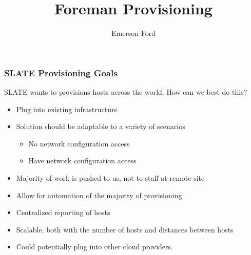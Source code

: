\documentclass{beamer}
\title{Foreman Provisioning}
\author{Emerson Ford}
\date{}
\begin{document}
\frame{\titlepage}

\begin{frame}
	\frametitle{SLATE Provisioning Goals}
	SLATE wants to provisions hosts across the world. How can we best do this?
	\begin{itemize}
		\item Plug into existing infrastructure
		\item Solution should be adaptable to a variety of scenarios
		      \begin{itemize}
			      \item No network configuration access
			      \item Have network configuration access
		      \end{itemize}
		\item Majority of work is pushed to us, not to staff at remote site
		\item Allow for automation of the majority of provisioning
		\item Centralized reporting of hosts
		\item Scalable, both with the number of hosts and distances between hosts
		\item Could potentially plug into other cloud providers.
	\end{itemize}
\end{frame}
\end{document}
